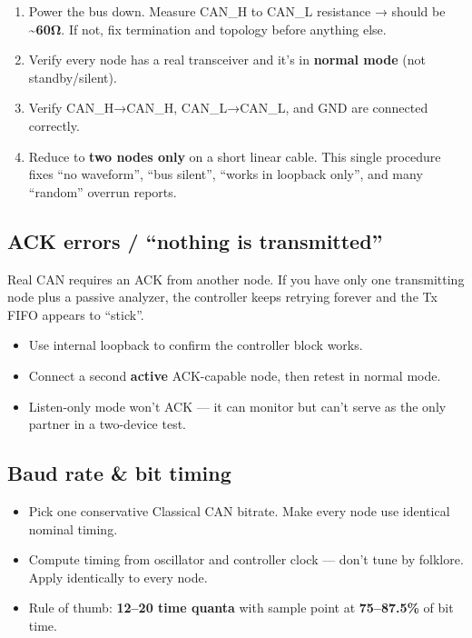 \documentclass[12pt,a4paper,oneside]{report}
\providecommand{\tightlist}{\setlength{\itemsep}{0pt}\setlength{\parskip}{0pt}}
\begin{document}
\begin{enumerate}
\def\labelenumi{\arabic{enumi}.}
\tightlist
\item
  Power the bus down. Measure CAN\_H to CAN\_L resistance → should be
  \textbf{\textasciitilde60Ω}. If not, fix termination and topology before
  anything else.
\item
  Verify every node has a real transceiver and it's in \textbf{normal mode} (not
  standby/silent).
\item
  Verify CAN\_H→CAN\_H, CAN\_L→CAN\_L, and GND are connected correctly.
\item
  Reduce to \textbf{two nodes only} on a short linear cable. This single
  procedure fixes ``no waveform'', ``bus silent'', ``works in loopback only'',
  and many ``random'' overrun reports.
\end{enumerate}

\subsection{ACK errors / ``nothing is
transmitted''}\label{ack-errors-nothing-is-transmitted}

Real CAN requires an ACK from another node. If you have only one transmitting
node plus a passive analyzer, the controller keeps retrying forever and the Tx
FIFO appears to ``stick''.

\begin{itemize}
\tightlist
\item
  Use internal loopback to confirm the controller block works.
\item
  Connect a second \textbf{active} ACK-capable node, then retest in normal mode.
\item
  Listen-only mode won't ACK --- it can monitor but can't serve as the only
  partner in a two-device test.
\end{itemize}

\subsection{Baud rate \& bit timing}\label{baud-rate-bit-timing}

\begin{itemize}
\tightlist
\item
  Pick one conservative Classical CAN bitrate. Make every node use identical
  nominal timing.
\item
  Compute timing from oscillator and controller clock --- don't tune by
  folklore. Apply identically to every node.
\item
  Rule of thumb: \textbf{12--20 time quanta} with sample point at
  \textbf{75--87.5\%} of bit time.
\end{itemize}
\end{document}
